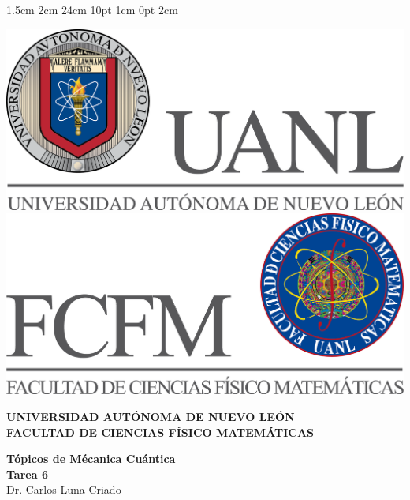 \documentclass[12pt,letterpaper]{report}
\begin{document}
\setmargins{2.5cm}      
{1.5cm}                     
{2cm}  
{24cm}                    
{10pt}                          
{1cm}                          
{0pt}                             
{2cm}
\begin{titlepage}
\begin{center}
\includegraphics[scale=0.40]{../../Logos/uanl.png} 
\hspace{2.5cm}
\includegraphics[scale=0.40]{../../Logos/fcfm.png}
\end{center}
\vspace{2cm}
\begin{center}
\textbf{
UNIVERSIDAD AUTÓNOMA DE NUEVO LEÓN\\
FACULTAD DE CIENCIAS
    FÍSICO MATEMÁTICAS}\\
\vspace*{2cm}
\begin{large}
\vspace{1cm}
\large{\textbf{Tópicos de Mécanica Cuántica}}\\
\textbf{Tarea 6}\\
Dr. Carlos Luna Criado\\
\end{large}
\vspace{3.5cm}
\begin{minipage}{0.6\linewidth}
\vspace{0.5cm}

\end{minipage}
\end{center}
\end{titlepage}
\end{document}

